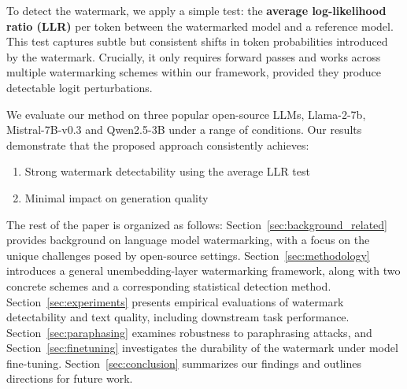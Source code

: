 To detect the watermark, we apply a simple test: the \textbf{average log-likelihood ratio (LLR)} per token between the watermarked model and a reference model. This test captures subtle but consistent shifts in token probabilities introduced by the watermark. Crucially, it only requires forward passes and works across multiple watermarking schemes within our framework, provided they produce detectable logit perturbations.

We evaluate our method on three popular open-source LLMs, Llama-2-7b, Mistral-7B-v0.3 and Qwen2.5-3B under a range of conditions. Our results demonstrate that the proposed approach consistently achieves:

\begin{enumerate}

    \item Strong watermark detectability using the average LLR test

    \item Minimal impact on generation quality

\end{enumerate}

The rest of the paper is organized as follows: Section~\ref{sec:background_related} provides background on language model watermarking, with a focus on the unique challenges posed by open-source settings. Section~\ref{sec:methodology} introduces a general unembedding-layer watermarking framework, along with two concrete schemes and a corresponding statistical detection method. Section~\ref{sec:experiments} presents empirical evaluations of watermark detectability and text quality, including downstream task performance. Section~\ref{sec:paraphasing} examines robustness to paraphrasing attacks, and Section~\ref{sec:finetuning} investigates the durability of the watermark under model fine-tuning. Section~\ref{sec:conclusion} summarizes our findings and outlines directions for future work.